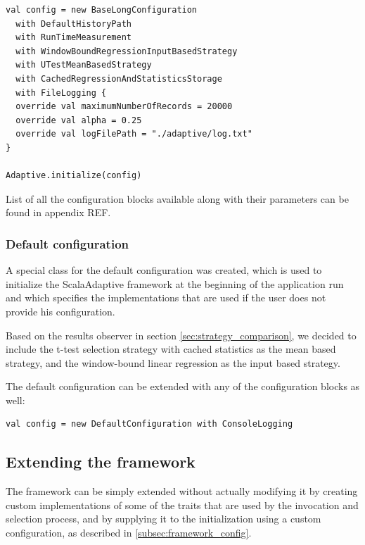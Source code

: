 \lstset{style=Scala}
\begin{lstlisting}
val config = new BaseLongConfiguration
  with DefaultHistoryPath
  with RunTimeMeasurement
  with WindowBoundRegressionInputBasedStrategy
  with UTestMeanBasedStrategy
  with CachedRegressionAndStatisticsStorage
  with FileLogging {
  override val maximumNumberOfRecords = 20000
  override val alpha = 0.25
  override val logFilePath = "./adaptive/log.txt"
}

Adaptive.initialize(config)
\end{lstlisting}

List of all the configuration blocks available along with their parameters can be found in appendix REF.


\subsubsection{Default configuration}

A special class for the default configuration was created, which is used to initialize the ScalaAdaptive framework at the beginning of the application run and which specifies the implementations that are used if the user does not provide his configuration.

Based on the results observer in section \ref{sec:strategy_comparison}, we decided to include the t-test selection strategy with cached statistics as the mean based strategy, and the window-bound linear regression as the input based strategy.

The default configuration can be extended with any of the configuration blocks as well:

\lstset{style=Scala}
\begin{lstlisting}
val config = new DefaultConfiguration with ConsoleLogging
\end{lstlisting}

\subsection{Extending the framework}

The framework can be simply extended without actually modifying it by creating custom implementations of some of the traits that are used by the invocation and selection process, and by supplying it to the  initialization using a custom configuration, as described in \ref{subsec:framework_config}.

